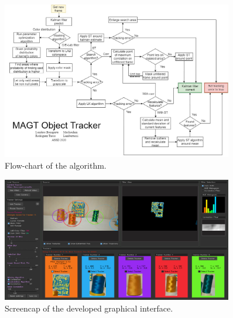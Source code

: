 \begin{figure}
	\centering
	\includegraphics[width=0.9\textwidth]{../flowchart.jpg}
	\caption{Flow-chart of the algorithm.}
	\label{fig:Flowchart}
\end{figure}

\begin{figure}
	\centering
	\includegraphics[width=0.9\textwidth]{Imagenes/gui.png}
	\caption{Screencap of the developed graphical interface.}
	\label{gui}
\end{figure}

